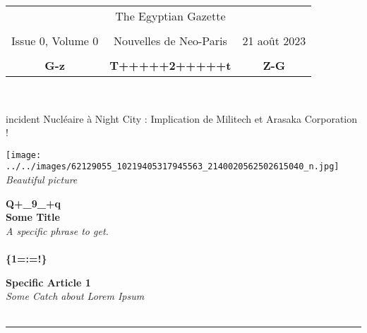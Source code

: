 \documentclass[11pt,twoside,a4paper]{article}
\def\date{21 août 2023} %
\def\maketitle{%
	\setlength{\parindent}{0em}
	\begin{center}
		\begin{tabular}[c]{c|c|c}
												& \setmainfont{Chomsky} \Huge{The Egyptian Gazette}						&																\\
												& 																		&																\\
			Issue 0, Volume 0 					& \setmainfont{DS Zierschrift} \Large{Nouvelles de Neo-Paris}			& \date															\\
												& 																		&																\\
	\setmainfont{FoglihtenDeH02} \textbf{G-z}	& \setmainfont{FoglihtenDeH02} \textbf{T+++++2+++++t}					&	\setmainfont{FoglihtenDeH02} \textbf{Z-G}					\\
		\end{tabular}~\\
	\end{center}
	\setlength{\parindent}{2\parskip}
}%
\begin{document}


\maketitle
\thispagestyle{empty}

\large{\setmainfont{Sprawl} incident Nucl{\'e}aire {\`a} Night City : \newline Implication de Militech et Arasaka Corporation !}

\begin{multicols}{2}

\small

\texttt{[image: ../../images/62129055\_10219405317945563\_2140020562502615040\_n.jpg]}
{\centering \emph{Beautiful picture} } 

{\centering \Huge \setmainfont{FoglihtenDeH02} \textbf{Q+\_9\_+q} }~\\

\textbf{Some Title}~\\
\emph{A specific phrase to get. }~\\

\lipsum[1-3] ~\\ %


{\centering \Huge \setmainfont{FoglihtenDeH02} \textbf{\{1=:=!\}} }~\\

	\begin{multicols}{2}
	
		\textbf{Specific Article 1}~\\
		\emph{Some Catch about Lorem Ipsum}~\\
		
		\lipsum[1-2]~\\
	
	\end{multicols}
	
	\columnbreak %
	
	{\centering \rule{0.34\textwidth}{1pt} }~\\
	
\end{multicols}
\end{document}
